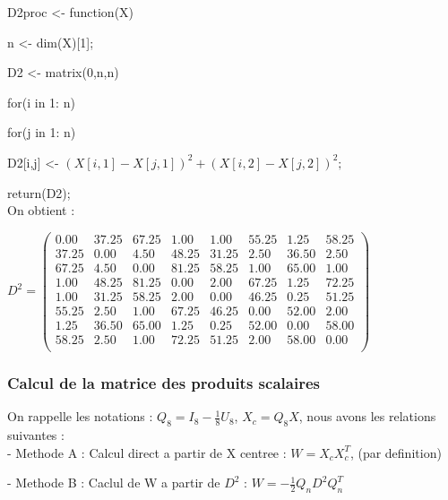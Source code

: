 \documentclass[a4paper,11pt]{article}
\begin{document}
\noindent D2proc <- function(X)

n <- dim(X)[1];

D2 <- matrix(0,n,n)

for(i in 1: n)

\hspace{1cm}for(j in 1: n)

\hspace{2cm} D2[i,j] <- $(X[i,1] - X[j,1])^2 + (X[i,2] - X[j,2])^2;$

return(D2);\\

\noindent On obtient : 
\begin{center}
$D^2 = \begin{pmatrix}
0.00&37.25&67.25&1.00&1.00&55.25&1.25&58.25\\
37.25&0.00&4.50&48.25&31.25&2.50&36.50&2.50\\
67.25&4.50&0.00&81.25&58.25&1.00&65.00&1.00\\
1.00&48.25&81.25&0.00&2.00&67.25&1.25&72.25\\
1.00&31.25&58.25&2.00&0.00&46.25&0.25&51.25\\
55.25&2.50&1.00&67.25&46.25&0.00&52.00 &2.00\\
1.25&36.50&65.00&1.25&0.25&52.00&0.00&58.00\\
58.25&2.50&1.00&72.25&51.25&2.00&58.00&0.00\\
\end{pmatrix}$
\end{center}

\subsubsection{Calcul de la matrice des produits scalaires}

\noindent On rappelle les notations : $Q_8 = I_8 - \frac{1}{8} U_8$, $X_c = Q_8 X$, nous avons les relations suivantes :\\

-  Methode A : Calcul direct a partir de X centree : $W = X_c  X_c^T$, (par definition)

- Methode B : Caclul de W a partir de $D^2$ : $W = -\frac{1}{2} Q_n  D^2  Q_n^T$\\
\end{document}
